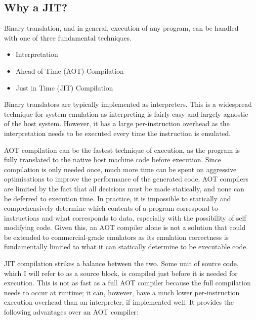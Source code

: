 \subsection{Why a JIT?}


Binary translation, and in general, execution of any program, can be handled with one of three fundamental techniques.

\begin{itemize}
    \item Interpretation
    \item Ahead of Time (AOT) Compilation
    \item Just in Time (JIT) Compilation
\end{itemize}

Binary translators are typically implemented as interpreters. This is a widespread technique for system emulation as interpreting is fairly easy and largely agnostic of the host system. However, it has a large per-instruction overhead as the interpretation needs to be executed every time the instruction is emulated.

AOT compilation can be the fastest technique of execution, as the program is fully translated to the native host machine code before execution. Since compilation is only needed once, much more time can be spent on aggressive optimisations to improve the performance of the generated code. AOT compilers are limited by the fact that all decisions must be made statically, and none can be deferred to execution time. In practice, it is impossible to statically and comprehensively determine which contents of a program correspond to instructions and what corresponds to data, especially with the possibility of self modifying code. Given this, an AOT compiler alone is not a solution that could be extended to commercial-grade emulators as its emulation correctness is fundamentally limited to what it can statically determine to be executable code.

JIT compilation strikes a balance between the two. Some unit of source code, which I will refer to as a source block, is compiled just before it is needed for execution. This is not as fast as a full AOT compiler because the full compilation needs to occur at runtime; it can, however, have a much lower per-instruction execution overhead than an interpreter, if implemented well. It provides the following advantages over an AOT compiler:

